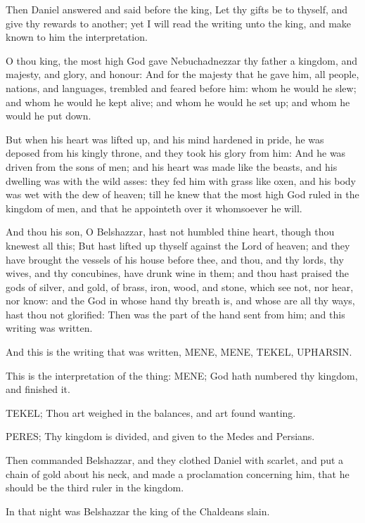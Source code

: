 \Verse Then Daniel answered and said before the king, Let thy gifts be to thyself, and give thy rewards to another; yet I will read the writing unto the king, and make known to him the interpretation.

\Verse O thou king, the most high God gave Nebuchadnezzar thy father a kingdom, and majesty, and glory, and honour: \Verse And for the majesty that he gave him, all people, nations, and languages, trembled and feared before him: whom he would he slew; and whom he would he kept alive; and whom he would he set up; and whom he would he put down.

\Verse But when his heart was lifted up, and his mind hardened in pride, he was deposed from his kingly throne, and they took his glory from him: \Verse And he was driven from the sons of men; and his heart was made like the beasts, and his dwelling was with the wild asses: they fed him with grass like oxen, and his body was wet with the dew of heaven; till he knew that the most high God ruled in the kingdom of men, and that he appointeth over it whomsoever he will.

\Verse And thou his son, O Belshazzar, hast not humbled thine heart, though thou knewest all this; \Verse But hast lifted up thyself against the Lord of heaven; and they have brought the vessels of his house before thee, and thou, and thy lords, thy wives, and thy concubines, have drunk wine in them; and thou hast praised the gods of silver, and gold, of brass, iron, wood, and stone, which see not, nor hear, nor know: and the God in whose hand thy breath is, and whose are all thy ways, hast thou not glorified: \Verse Then was the part of the hand sent from him; and this writing was written.

\Verse And this is the writing that was written, MENE, MENE, TEKEL, UPHARSIN.

\Verse This is the interpretation of the thing: MENE; God hath numbered thy kingdom, and finished it.

\Verse TEKEL; Thou art weighed in the balances, and art found wanting.

\Verse PERES; Thy kingdom is divided, and given to the Medes and Persians.

\Verse Then commanded Belshazzar, and they clothed Daniel with scarlet, and put a chain of gold about his neck, and made a proclamation concerning him, that he should be the third ruler in the kingdom.

\Verse In that night was Belshazzar the king of the Chaldeans slain.

